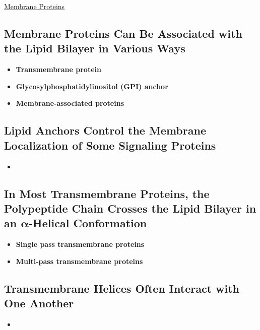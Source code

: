 \documentclass[12pt,letterpaper]{article}
\begin{document}
\hypertarget{10.2}{}
\begin{secbox}{\hyperlink{10}{Membrane Proteins}}{
    \subsection*{Membrane Proteins Can Be Associated with the Lipid Bilayer in Various Ways}
    \begin{itemize}
        \item \textbf{Transmembrane protein}
        \item \textbf{Glycosylphosphatidylinositol (GPI) anchor}
        \item \textbf{Membrane-associated proteins}
    \end{itemize}
    
    \subsection*{Lipid Anchors Control the Membrane Localization of Some Signaling Proteins}
    \begin{itemize}
        \item
    \end{itemize}
    
    \subsection*{In Most Transmembrane Proteins, the Polypeptide Chain Crosses the Lipid Bilayer in an \(\bm{\alpha}\)-Helical Conformation}
    \begin{itemize}
        \item \textbf{Single pass transmembrane proteins}
        \item \textbf{Multi-pass transmembrane proteins}
    \end{itemize}
    
    \subsection*{Transmembrane \bfg{\alpha} Helices Often Interact with One Another}
    \begin{itemize}
        \item 
    \end{itemize}

}
\end{secbox}
\end{document}
